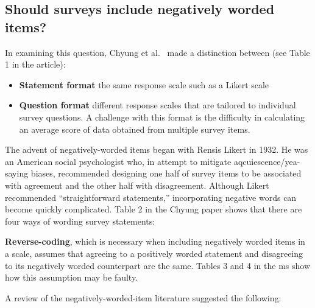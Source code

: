 \documentclass[
  english,
]{book}
\providecommand{\tightlist}{%
  \setlength{\itemsep}{0pt}\setlength{\parskip}{0pt}}
\begin{document}
\hypertarget{should-surveys-include-negatively-worded-items}{%
\subsection{Should surveys include negatively worded items?}\label{should-surveys-include-negatively-worded-items}}

In examining this question, Chyung et al.~\citep{chyung_evidencebased_2018} made a distinction between (see Table 1 in the article):

\begin{itemize}
\tightlist
\item
  \textbf{Statement format} the same response scale such as a Likert scale
\item
  \textbf{Question format} different response scales that are tailored to individual survey questions. A challenge with this format is the difficulty in calculating an average score of data obtained from multiple survey items.
\end{itemize}

The advent of negatively-worded items began with Rensis Likert in 1932. He was an American social psychologist who, in attempt to mitigate aqcuiescence/yea-saying biases, recommended designing one half of survey items to be associated with agreement and the other half with disagreement. Although Likert recommended ``straightforward statements,'' incorporating negative words can become quickly complicated. Table 2 in the Chyung paper shows that there are four ways of wording survey statements:

\textbf{Reverse-coding}, which is necessary when including negatively worded items in a scale, assumes that agreeing to a positively worded statement and disagreeing to its negatively worded counterpart are the same. Tables 3 and 4 in the ms show how this assumption may be faulty.

A review of the negatively-worded-item literature suggested the following:
\end{document}
